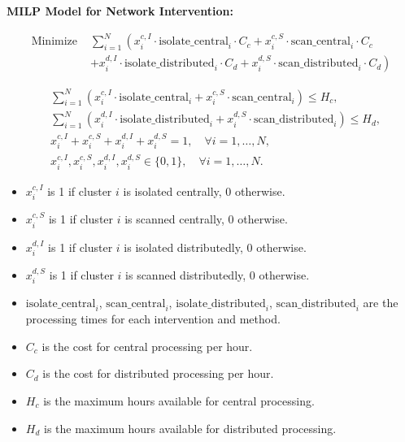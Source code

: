 \documentclass{article}
\begin{document}
\textbf{MILP Model for Network Intervention:}

\begin{align*}
\text{Minimize } & \sum_{i=1}^{N} \left( x_{i}^{c,I} \cdot \text{isolate\_central}_i \cdot C_c + x_{i}^{c,S} \cdot \text{scan\_central}_i \cdot C_c \right. \\
                & \left. + x_{i}^{d,I} \cdot \text{isolate\_distributed}_i \cdot C_d + x_{i}^{d,S} \cdot \text{scan\_distributed}_i \cdot C_d \right)
\end{align*}

\begin{align*}
& \sum_{i=1}^{N} \left( x_{i}^{c,I} \cdot \text{isolate\_central}_i + x_{i}^{c,S} \cdot \text{scan\_central}_i \right) \leq H_c, \\
& \sum_{i=1}^{N} \left( x_{i}^{d,I} \cdot \text{isolate\_distributed}_i + x_{i}^{d,S} \cdot \text{scan\_distributed}_i \right) \leq H_d, \\
& x_{i}^{c,I} + x_{i}^{c,S} + x_{i}^{d,I} + x_{i}^{d,S} = 1, \quad \forall i = 1, \dots, N, \\
& x_{i}^{c,I}, x_{i}^{c,S}, x_{i}^{d,I}, x_{i}^{d,S} \in \{0, 1\}, \quad \forall i = 1, \dots, N.
\end{align*}

\begin{itemize}
    \item $x_{i}^{c,I}$ is 1 if cluster $i$ is isolated centrally, 0 otherwise.
    \item $x_{i}^{c,S}$ is 1 if cluster $i$ is scanned centrally, 0 otherwise.
    \item $x_{i}^{d,I}$ is 1 if cluster $i$ is isolated distributedly, 0 otherwise.
    \item $x_{i}^{d,S}$ is 1 if cluster $i$ is scanned distributedly, 0 otherwise.
    \item $\text{isolate\_central}_i$, $\text{scan\_central}_i$, $\text{isolate\_distributed}_i$, $\text{scan\_distributed}_i$ are the processing times for each intervention and method.
    \item $C_c$ is the cost for central processing per hour.
    \item $C_d$ is the cost for distributed processing per hour.
    \item $H_c$ is the maximum hours available for central processing.
    \item $H_d$ is the maximum hours available for distributed processing.
\end{itemize}
\end{document}
